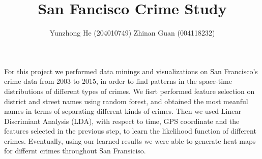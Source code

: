 \documentclass[12pt]{article}
\newenvironment{abs}[2][Abstract]{\begin{trivlist}
\item[\hskip \labelsep {\bfseries #1}\hskip \labelsep {\bfseries #2}]}{\end{trivlist}}
\newenvironment{p1}[2][Motivation]{\begin{trivlist}
\item[\hskip \labelsep {\bfseries #1}\hskip \labelsep {\bfseries #2}]}{\end{trivlist}}
\newenvironment{p2}[2][Data]{\begin{trivlist}
\item[\hskip \labelsep {\bfseries #1}\hskip \labelsep {\bfseries #2}]}{\end{trivlist}}
\begin{document}
 
 
\title{San Fancisco Crime Study}
\author{Yunzhong He (204010749) Zhinan Guan (004118232)}
\maketitle

\begin{abs}{}
\item{}
For this project we performed data minings and visualizations on San Francisco's crime data from 2003 to 2015, in order to find patterns in the space-time distributions of different types of crimes. We fisrt performed feature selection on district and street names using random forest, and obtained the most meanful names in terms of separating different kinds of crimes. Then we used Linear Discrimiant Analysis (LDA), with respect to time, GPS coordinate and the features selected in the previous step, to learn the likelihood function of different crimes. Eventually, using our learned results we were able to generate heat maps for differnt crimes throughout San Fransiciso.
\end{abs}

\begin{p1}{}
\item{}
\end{p1}

\begin{p2}{}
\item{}
\end{p2}
\end{document}
